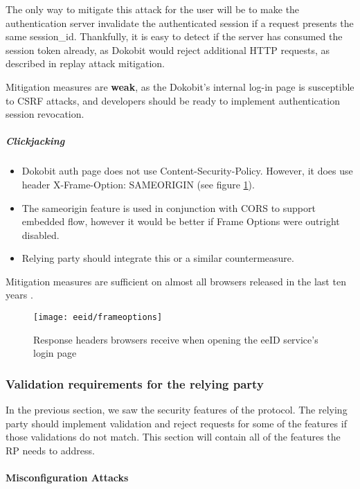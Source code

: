 The only way to mitigate this attack for the user will be to make the authentication server invalidate the authenticated session if a request presents the same session\_id. Thankfully, it is easy to detect if the server has consumed the session token already, as Dokobit would reject additional HTTP requests, as described in replay attack mitigation.

Mitigation measures are \textbf{weak}, as the Dokobit's internal log-in page is susceptible to CSRF attacks, and developers should be ready to implement authentication session revocation.

\subparagraph{Clickjacking}

\begin{itemize}
  \item Dokobit auth page does not use Content-Security-Policy. However, it does use header X-Frame-Option: {SAMEORIGIN} (see figure \ref{fig:dokobit-responseheaders}).
  \item The sameorigin feature is used in conjunction with CORS to support embedded flow, however it would be better if Frame Options were outright disabled.
  \item Relying party should integrate this or a similar countermeasure.
\end{itemize}

Mitigation measures are sufficient on almost all browsers released in the last ten years \cite{caniuse-xframeoptions}.

\begin{figure}
  \centering
  \texttt{[image: eeid/frameoptions]}
  \caption{Response headers browsers receive when opening the eeID service's login page}
  \label{fig:dokobit-responseheaders}
\end{figure}

\subsubsection{Validation requirements for the relying party}

In the previous section, we saw the security features of the protocol. The relying party should implement validation and reject requests for some of the features if those validations do not match. This section will contain all of the features the RP needs to address.

\paragraph{Misconfiguration Attacks}

